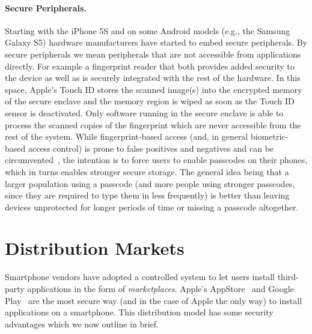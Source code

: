 \paragraph{Secure Peripherals.} Starting with the iPhone 5S and on some Android models (e.g., the Samsung Galaxy S5) hardware manufacturers have started to embed secure peripherals. By secure peripherals we mean peripherals that are not accessible from applications directly. For example a fingerprint reader that both provides added security to the device as well as is securely integrated with the rest of the hardware. In this space, Apple's Touch ID stores the scanned image(s) into the encrypted memory of the secure enclave and the memory region is wiped as soon as the Touch ID sensor is deactivated. Only software running in the secure enclave is able to process the scanned copies of the fingerprint which are never accessible from the rest of the system. While fingerprint-based access (and, in general biometric-based access control) is prone to false positives and negatives and can be circumvented~\cite{cccfingerprint}, the intention is to force users to enable passcodes on their phones, which in turns enables stronger secure storage. The general idea being that a larger population using a passcode (and more people using stronger passcodes, since they are required to type them in less frequently) is better than leaving devices unprotected for longer periods of time or missing a passcode altogether.

\section{Distribution Markets}
\label{sec:bg_markets}

Smartphone vendors have adopted a controlled system to let users install third-party applications in the form of \emph{marketplaces}. Apple's AppStore~\cite{appstore} and Google Play~\cite{googleplay} are the most secure way (and in the case of Apple the only way) to install applications on a smartphone. This distribution model has some security advantages which we now outline in brief.

